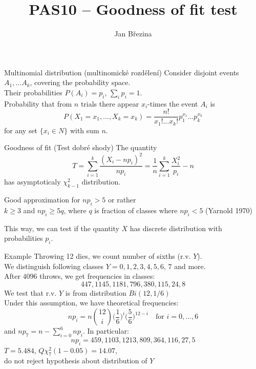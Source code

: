 \documentclass[smaller]{beamer}
\title{PAS10 -- Goodness of fit test}
\author{Jan B\v rezina}
\institute %
{
  Technical University of Liberec
}
\def\xskip{{\vspace{2ex}}}
\def\cz#1{{\small (#1)}}
\begin{document}
\begin{frame}
  \titlepage
\end{frame}

\begin{frame}{Multinomial distribution \cz{multinomické rozdělení} }
Consider disjoint events $A_1,\dots A_k$, covering the probability space.\\
Their probabilities $P(A_i) = p_i$, $\sum_i p_i =1$.\\

\xskip
Probability that from $n$ trials there appear  $x_i$-times the event $A_i$ is
\[
 P(X_1 = x_1,\dots, X_k = x_k) = \frac{n!}{x_1!\dots x_k!}p_1^{x_1} \dots p_k^{x_k}
\]
for any set $\{x_i\in N \}$ with sum $n$.

\end{frame}

\begin{frame}{Goodness of fit \cz{Test dobré shody}}
\xskip
The quantity 
\[
 T=\sum_{i=1}^k \frac{ (X_i - np_i)^2}{np_i} = \frac{1}{n}\sum_{i=1}^k \frac{X_i^2}{p_i} - n
\]
has asymptoticaly $\chi^2_{k-1}$ distribution. 

\xskip
Good approximation for $np_i >5$ or rather\\
$k\ge 3$ and $np_i \ge 5q$, where $q$ is fraction of classes where $np_i<5$ (Yarnold 1970)

\xskip
This way, we can test if the quantity $X$ has discrete distribution with probabilities $p_i$.
\end{frame}

\begin{frame}{Example}
 Throwing 12 dies, we count number of sixths (r.v. $Y$).\\
 We distinguish following classes $Y=0,1,2,3,4,5,6$, $7$ and more.\\
 After $4096$ throws, we get frequencies in classes:
\[
 447, 1145, 1181, 796, 380, 115, 24, 8
\]
We test that r.v. $Y$ is from distribution  $Bi(12, 1/6)$\\

Under this assumption, we have theoretical frequencies:
\[
 np_i = n \binom{12}{i}\Big(\frac{1}{6}\Big)^i \Big(\frac{5}{6}\Big)^{12-i}
 \quad\text{for $i=0,\dots,6$}
\]
and $np_7 = n- \sum_{i=0}^6 np_i$. In particular:
\[
np_i = 459, 1103, 1213, 809, 364, 116, 27, 5
\]
$T = 5.484 $, $Q\chi^2_{7}(1-0.05) = 14.07$,\\
do not reject hypothesis about distribution of $Y$

\end{frame}
\end{document}
